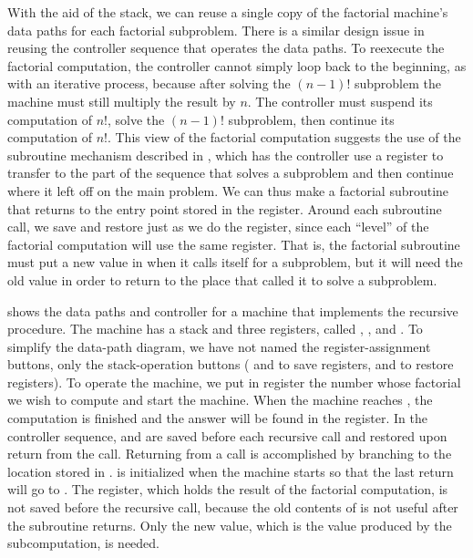 With the aid of the stack, we can reuse a single copy of the factorial machine’s data paths for each factorial subproblem.
There is a similar design issue in reusing the controller sequence that operates the data paths.
To reexecute the factorial computation, the controller cannot simply loop back to the beginning, as with an iterative process, because after solving the \( (n - 1)! \) subproblem the machine must still multiply the result by \( n \).
The controller must suspend its computation of \( n! \), solve the \( (n - 1)! \) subproblem, then continue its computation of \( n! \).
This view of the factorial computation suggests the use of the subroutine mechanism described in , which has the controller use a  register to transfer to the part of the sequence that solves a subproblem and then continue where it left off on the main problem.
We can thus make a factorial subroutine that returns to the entry point stored in the  register.
Around each subroutine call, we save and restore  just as we do the  register, since each “level” of the factorial computation will use the same  register.
That is, the factorial subroutine must put a new value in  when it calls itself for a subproblem, but it will need the old value in order to return to the place that called it to solve a subproblem.

 shows the data paths and controller for a machine that implements the recursive  procedure.
The machine has a stack and three registers, called , , and .
To simplify the data-path diagram, we have not named the register-assignment buttons, only the stack-operation buttons ( and  to save registers,  and  to restore registers).
To operate the machine, we put in register  the number whose factorial we wish to compute and start the machine.
When the machine reaches , the computation is finished and the answer will be found in the  register.
In the controller sequence,  and  are saved before each recursive call and restored upon return from the call.
Returning from a call is accomplished by branching to the location stored in .
 is initialized when the machine starts so that the last return will go to .
The  register, which holds the result of the factorial computation, is not saved before the recursive call, because the old contents of  is not useful after the subroutine returns.
Only the new value, which is the value produced by the subcomputation, is needed.

